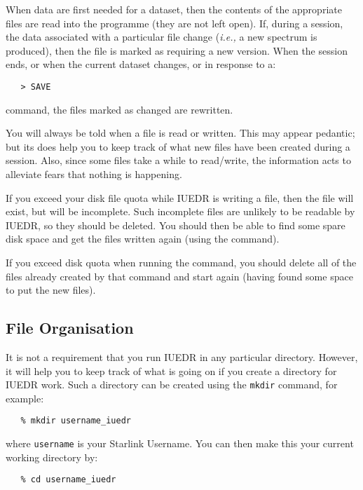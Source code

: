When data are first needed for a dataset, then the contents of the appropriate
files are read into the programme (they are not left open).
If, during a session, the data associated with a particular file change
({\it{i.e.,}}  a new spectrum is produced), then the file is marked as
requiring a new version.
When the session ends, or when the current dataset changes, or in response to
a:

\begin{verbatim}
   > SAVE
\end{verbatim}

command, the files marked as changed are rewritten.

You will always be told when a file is read or written.  This may appear
pedantic; but its does help you to keep track of what new files have been
created during a session.  Also, since some files take a while to
read/write, the information acts to alleviate fears that nothing is
happening.

If you exceed your disk file quota while IUEDR is writing a file, then the
file will exist, but will be incomplete.  Such incomplete files are unlikely
to be readable by IUEDR, so they should be deleted.  You should then be able
to find some spare disk space and get the files written again (using the
 command)\@.

If you exceed disk quota when running the
 command, you should
delete all of the files already created by that command and start again
(having found some space to put the new files)\@.


\subsection{File Organisation}

It is not a requirement that you run IUEDR in any particular
directory.  However, it will help you to keep track of what is going on if
you create a directory for IUEDR work.  Such a directory can be created
using the \verb+mkdir+ command, for example:

\begin{verbatim}
   % mkdir username_iuedr
\end{verbatim}

where \verb+username+ is your Starlink Username.  You can then make this your
current working directory by:

\begin{verbatim}
   % cd username_iuedr
\end{verbatim}

